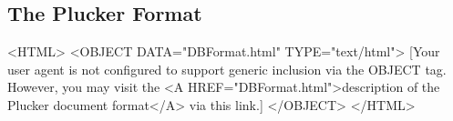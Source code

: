 %
%
\begin{htmlonly}
\chapter{The Plucker Format}
\end{htmlonly}

\begin{rawhtml}
<HTML>
<OBJECT DATA="DBFormat.html" TYPE="text/html">
[Your user agent is not configured to support generic inclusion via the OBJECT tag.  However, you may visit the <A HREF="DBFormat.html">description of the Plucker document format</A> via this link.]
</OBJECT>
</HTML>
\end{rawhtml}
